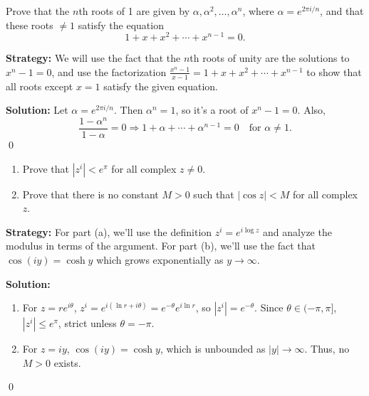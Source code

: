 \begin{problembox}
\begin{problemstatement}
Prove that the \( n \)th roots of 1 are given by \( \alpha, \alpha^2, \ldots, \alpha^n \), where \( \alpha = e^{2\pi i/n} \), and that these roots \( \ne 1 \) satisfy the equation
\[
1 + x + x^2 + \cdots + x^{n-1} = 0.
\]
\end{problemstatement}
\end{problembox}

\noindent\textbf{Strategy:} We will use the fact that the $n$th roots of unity are the solutions to $x^n - 1 = 0$, and use the factorization $\frac{x^n - 1}{x - 1} = 1 + x + x^2 + \cdots + x^{n-1}$ to show that all roots except $x = 1$ satisfy the given equation.

\bigskip\noindent\textbf{Solution:}
Let \( \alpha = e^{2\pi i/n} \). Then \( \alpha^n = 1 \), so it's a root of \( x^n - 1 = 0 \). Also,
\[
\frac{1 - \alpha^n}{1 - \alpha} = 0 \Rightarrow 1 + \alpha + \cdots + \alpha^{n-1} = 0 \quad \text{for } \alpha \ne 1.
\]\qed


\begin{problembox}
\begin{problemstatement}
\begin{enumerate}[label=\alph*)]
\item Prove that \( |z^i| < e^{\pi} \) for all complex \( z \ne 0 \).
\item Prove that there is no constant \( M > 0 \) such that \( |\cos z| < M \) for all complex \( z \).
\end{enumerate}
\end{problemstatement}
\end{problembox}

\noindent\textbf{Strategy:} For part (a), we'll use the definition $z^i = e^{i\log z}$ and analyze the modulus in terms of the argument. For part (b), we'll use the fact that $\cos(iy) = \cosh y$ which grows exponentially as $y \to \infty$.

\bigskip\noindent\textbf{Solution:}
\begin{enumerate}[label=\alph*)]
\item For \( z = re^{i\theta} \), \( z^i = e^{i(\ln r + i\theta)} = e^{-\theta} e^{i \ln r} \), so \( |z^i| = e^{-\theta} \). Since \( \theta \in (-\pi, \pi] \), \( |z^i| \leq e^{\pi} \), strict unless \( \theta = -\pi \).
\item For \( z = iy \), \( \cos(iy) = \cosh y \), which is unbounded as \( |y| \to \infty \). Thus, no \( M > 0 \) exists.
\end{enumerate}\qed


